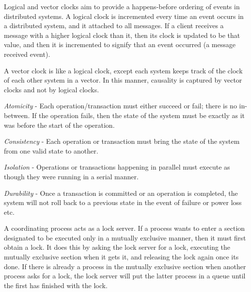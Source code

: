Logical and vector clocks aim to provide a happens-before ordering of events in
distributed systems. A logical clock is incremented every time an event occurs
in a distributed system, and it attached to all messages. If a client receives a
message with a higher logical clock than it, then its clock is updated to be
that value, and then it is incremented to signify that an event occurred (a
message received event).

A vector clock is like a logical clock, except each system keeps track of the
clock of each other system in a vector. In this manner, causality is captured by
vector clocks and not by logical clocks.


\begin{description}
  \item \textit{Atomicity} - Each operation/transaction must either succeed or 
  fail; there is no in-between. If the operation fails, then the state of the
  system must be exactly as it was before the start of the operation.
  \item \textit{Consistency} - Each operation or transaction must bring the
  state of the system from one valid state to another.
  \item \textit{Isolation} - Operations or transactions happening in parallel
  must execute as though they were running in a serial manner.
  \item \textit{Durability} - Once a transaction is committed or an operation
  is completed, the system will not roll back to a previous state in the event
  of failure or power loss etc.
\end{description}


A coordinating process acts as a lock server. If a process wants to enter a
section designated to be executed only in a mutually exclusive manner, then it
must first obtain a lock. It does this by asking the lock server for a lock,
executing the mutually exclusive section when it gets it, and releasing the lock
again once its done. If there is already a process in the mutually exclusive
section when another process asks for a lock, the lock server will put the
latter process in a queue until the first has finished with the lock.

